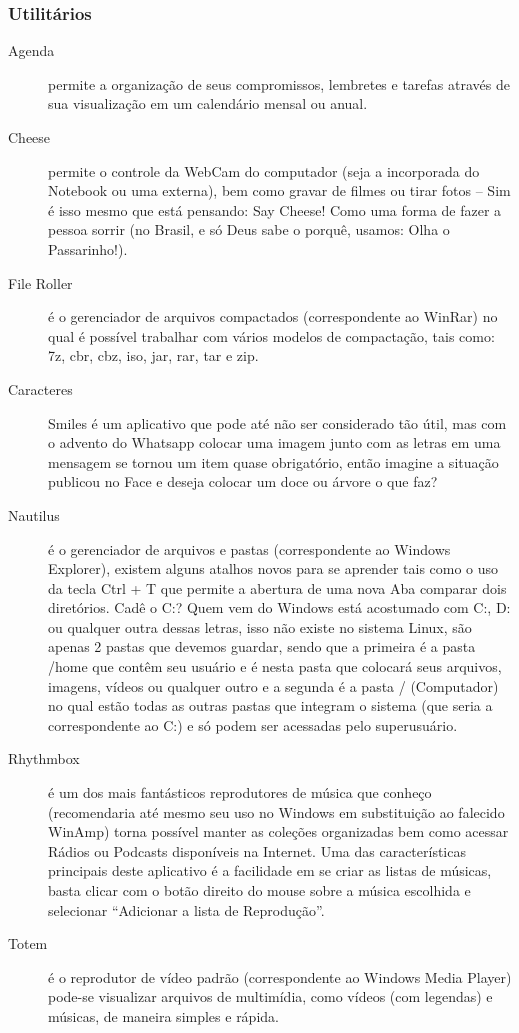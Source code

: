 \subsubsection{Utilitários}
\begin{description}
 \item[Agenda] permite a organização de seus compromissos, lembretes e tarefas através de sua visualização em um calendário mensal ou anual.
 \item[Cheese] permite o controle da WebCam do computador (seja a incorporada do Notebook ou uma externa), bem como gravar de filmes ou tirar fotos – Sim é isso mesmo que está pensando: Say Cheese! Como uma forma de fazer a pessoa sorrir (no Brasil, e só Deus sabe o porquê, usamos: Olha o Passarinho!).
 \item[File Roller] é o gerenciador de arquivos compactados (correspondente ao WinRar) no qual é possível trabalhar com vários modelos de compactação, tais como: 7z, cbr, cbz, iso, jar, rar, tar e zip.
 \item[Caracteres] Smiles é um aplicativo que pode até não ser considerado tão útil, mas com o advento do Whatsapp colocar uma imagem junto com as letras em uma mensagem se tornou um item quase obrigatório, então imagine a situação publicou no Face e deseja colocar um doce ou árvore o que faz?
 \item[Nautilus] é o gerenciador de arquivos e pastas (correspondente ao Windows Explorer), existem alguns atalhos novos para se aprender tais como o uso da tecla Ctrl + T que permite a abertura de uma nova Aba comparar dois diretórios. Cadê o C:? Quem vem do Windows está acostumado com C:, D: ou qualquer outra dessas letras, isso não existe no sistema Linux, são apenas 2 pastas que devemos guardar, sendo que a primeira é a pasta /home que contêm seu usuário e é nesta pasta que colocará seus arquivos, imagens, vídeos ou qualquer outro e a segunda é a pasta / (Computador) no qual estão todas as outras pastas que integram o sistema (que seria a correspondente ao C:) e só podem ser acessadas pelo superusuário.
 \item[Rhythmbox] é um dos mais fantásticos reprodutores de música que conheço (recomendaria até mesmo seu uso no Windows em substituição ao falecido WinAmp) torna possível manter as coleções organizadas bem como acessar Rádios ou Podcasts disponíveis na Internet. Uma das características principais deste aplicativo é a facilidade em se criar as listas de músicas, basta clicar com o botão direito do mouse sobre a música escolhida e selecionar “Adicionar a lista de Reprodução”.
 \item[Totem] é o reprodutor de vídeo padrão (correspondente ao Windows Media Player) pode-se visualizar arquivos de multimídia, como vídeos (com legendas) e músicas, de maneira simples e rápida.
\end{description}

